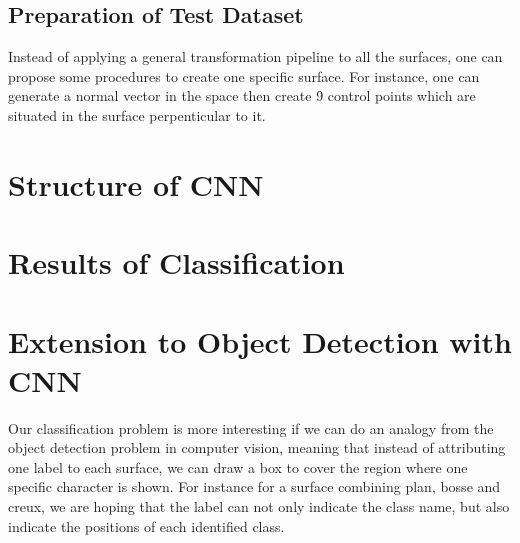 \documentclass[a4paper,10pt]{article}
\begin{document}
\subsection{Preparation of Test Dataset}
Instead of applying a general transformation pipeline to all the surfaces, one can propose some procedures to create one specific surface. For instance, one can generate a normal vector in the space then create 9 control points which are situated in the surface perpenticular to it. 


\section{Structure of CNN}

\section{Results of Classification}

\section{Extension to Object Detection with CNN}

Our classification problem is more interesting if we can do an analogy from the object detection problem in computer vision, meaning that instead of attributing one label to each surface, we can draw a box to cover the region where one specific character is shown. For instance for a surface combining plan, bosse and creux, we are hoping that the label can not only indicate the class name, but also indicate the positions of each identified class.
\end{document}
